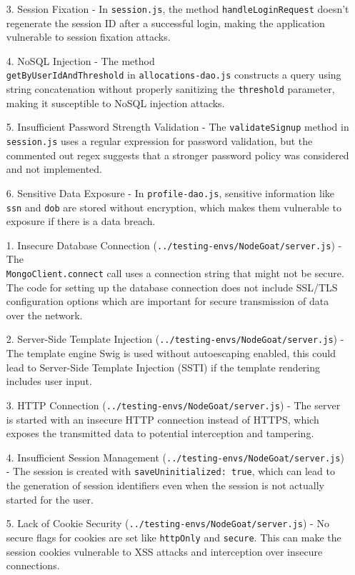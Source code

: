 \begin{enumerate}
  \item[3.] Session Fixation - In \texttt{session.js}, the method \texttt{handleLoginRequest} doesn't regenerate the session ID after a successful login, making the application vulnerable to session fixation attacks.
  \item[4.] NoSQL Injection - The method \\\texttt{getByUserIdAndThreshold} in \texttt{allocations-dao.js} constructs a query using string concatenation without properly sanitizing the \texttt{threshold} parameter, making it susceptible to NoSQL injection attacks.
  \item[5.] Insufficient Password Strength Validation - The \texttt{validateSignup} method in \texttt{session.js} uses a regular expression for password validation, but the commented out regex suggests that a stronger password policy was considered and not implemented.
  \item[6.] Sensitive Data Exposure - In \texttt{profile-dao.js}, sensitive information like \texttt{ssn} and \texttt{dob} are stored without encryption, which makes them vulnerable to exposure if there is a data breach. \\
  \item[1.] Insecure Database Connection (\texttt{../testing-envs/NodeGoat/server.js}) - The \\\texttt{MongoClient.connect} call uses a connection string that might not be secure. The code for setting up the database connection does not include SSL/TLS configuration options which are important for secure transmission of data over the network.
  \item[2.] Server-Side Template Injection (\texttt{../testing-envs/NodeGoat/server.js}) - The template engine Swig is used without autoescaping enabled, this could lead to Server-Side Template Injection (SSTI) if the template rendering includes user input.
  \item[3.] HTTP Connection (\texttt{../testing-envs/NodeGoat/server.js}) - The server is started with an insecure HTTP connection instead of HTTPS, which exposes the transmitted data to potential interception and tampering.
  \item[4.] Insufficient Session Management (\texttt{../testing-envs/NodeGoat/server.js}) - The session is created with \texttt{saveUninitialized: true}, which can lead to the generation of session identifiers even when the session is not actually started for the user.
  \item[5.] Lack of Cookie Security (\texttt{../testing-envs/NodeGoat/server.js}) - No secure flags for cookies are set like \texttt{httpOnly} and \texttt{secure}. This can make the session cookies vulnerable to XSS attacks and interception over insecure connections.

\end{enumerate}
